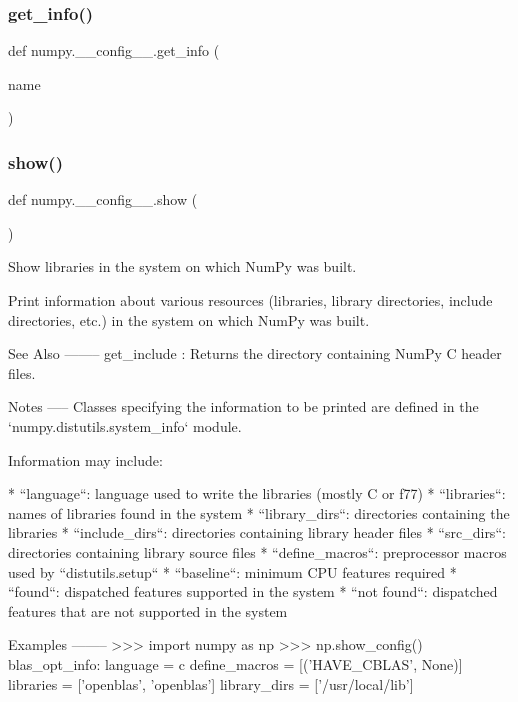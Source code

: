 \subsubsection{\texorpdfstring{get\+\_\+info()}{get\_info()}}
{\footnotesize\ttfamily def numpy.\+\_\+\+\_\+config\+\_\+\+\_\+.\+get\+\_\+info (\begin{DoxyParamCaption}\item[{}]{name }\end{DoxyParamCaption})}

\mbox{\label{namespacenumpy_1_1____config_____a762f8bf342ad98b24ef87a7f64ac3651}} 
\subsubsection{\texorpdfstring{show()}{show()}}
{\footnotesize\ttfamily def numpy.\+\_\+\+\_\+config\+\_\+\+\_\+.\+show (\begin{DoxyParamCaption}{ }\end{DoxyParamCaption})}

\begin{DoxyVerb}Show libraries in the system on which NumPy was built.

Print information about various resources (libraries, library
directories, include directories, etc.) in the system on which
NumPy was built.

See Also
--------
get_include : Returns the directory containing NumPy C
              header files.

Notes
-----
Classes specifying the information to be printed are defined
in the `numpy.distutils.system_info` module.

Information may include:

* ``language``: language used to write the libraries (mostly
  C or f77)
* ``libraries``: names of libraries found in the system
* ``library_dirs``: directories containing the libraries
* ``include_dirs``: directories containing library header files
* ``src_dirs``: directories containing library source files
* ``define_macros``: preprocessor macros used by
  ``distutils.setup``
* ``baseline``: minimum CPU features required
* ``found``: dispatched features supported in the system
* ``not found``: dispatched features that are not supported
  in the system

Examples
--------
>>> import numpy as np
>>> np.show_config()
blas_opt_info:
    language = c
    define_macros = [('HAVE_CBLAS', None)]
    libraries = ['openblas', 'openblas']
    library_dirs = ['/usr/local/lib']
\end{DoxyVerb}
 

